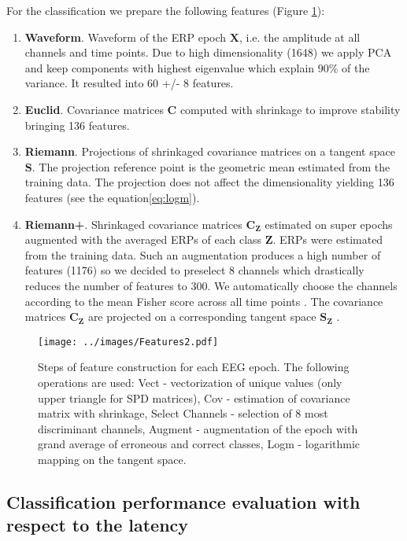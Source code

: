 \documentclass[12pt]{iopart}
\begin{document}
For the classification we prepare the following features (Figure \ref{fig:Features}):
\begin{enumerate}[label=F\arabic*]
    \item \textbf{Waveform}. Waveform of the ERP epoch $\mathbf{X}$, i.e. the amplitude at all channels and time points. Due to high
        dimensionality (1648) we apply PCA and keep components with highest eigenvalue
        which explain 90\% of the variance. It resulted into 60 +/- 8 features.
    \item \textbf{Euclid}. Covariance matrices $\mathbf{C}$ computed with shrinkage to improve stability bringing 136 features.
    \item \textbf{Riemann}. Projections of shrinkaged covariance matrices on a tangent space $\mathbf{S}$. The projection reference
        point is the geometric mean estimated from the training data.
        The projection does not affect the dimensionality yielding 136 features (see the equation\ref{eq:logm}).
    \item \textbf{Riemann+}. Shrinkaged covariance matrices $\mathbf{C_Z}$ estimated on super epochs augmented with the averaged ERPs
        of each class $\mathbf{Z}$. ERPs were estimated from the training data.
        Such an augmentation produces
        a high number of features (1176) so we decided to preselect 8 channels which
        drastically reduces the number of features to 300. We automatically choose
        the channels according to the mean Fisher score across all time points \cite{duda_pattern_2001}.
        The covariance matrices $\mathbf{C_Z}$ are projected on a corresponding tangent space $\mathbf{S_Z}$ .
\end{enumerate}


\begin{figure}[!t]
    \texttt{[image: ../images/Features2.pdf]}
\caption{Steps of feature construction for each EEG epoch. The following operations are used:
    Vect - vectorization of unique values (only upper triangle for SPD matrices), Cov - estimation of covariance matrix with shrinkage,
Select Channels - selection of 8 most discriminant channels,
Augment - augmentation of the epoch with grand average of erroneous and correct classes,
Logm - logarithmic mapping on the tangent space.}
\label{fig:Features}
\end{figure}

\subsection{Classification performance evaluation with respect to the latency}
\end{document}
